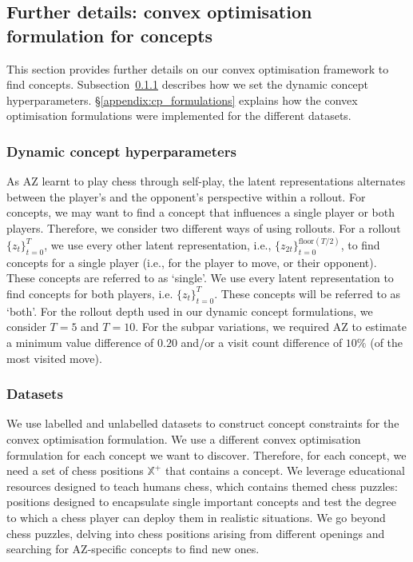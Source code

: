 \documentclass{article}
\def\Xset{\mathbb{X}}
\begin{document}
\subsection{Further details: convex optimisation formulation for concepts}

This section provides further details on our convex optimisation framework to find concepts.
Subsection~\ref{sec:hypers} describes how we set the dynamic concept hyperparameters. 
\S\ref{appendix:cp_formulations} explains how the convex optimisation formulations were implemented for the different datasets. 

\subsubsection{Dynamic concept hyperparameters} \label{sec:hypers}
As AZ learnt to play chess through self-play, the latent representations alternates between the player's and the opponent's perspective within a rollout. 
For concepts, we may want to find a concept that influences a single player or both players. 
Therefore, we consider two different ways of using rollouts. For a rollout  $\{z_{t} \}_{t=0}^T$, we use every other latent representation, i.e., $\{z_{2t} \}_{t=0}^{\text{floor}(T/2)}$, to find concepts for a single player (i.e., for the player to move, or their opponent). These concepts are referred to as `single'. We use every latent representation to find concepts for both players, i.e. $\{z_{t} \}_{t=0}^T$. These concepts will be referred to as `both'.
For the rollout depth used in our dynamic concept formulations, we consider $T=5$ and $T=10$. 
For the subpar variations, we required AZ to estimate a minimum value difference of $0.20$ and/or a visit count difference of $10\%$ (of the most visited move). 

\subsubsection{Datasets}\label{appendix:dataset}
We use labelled and unlabelled datasets to construct concept constraints for the convex optimisation formulation. We use a different convex optimisation formulation for each concept we want to discover. Therefore, for each concept, we need a set of chess positions $\Xset^+$ that contains a concept.
We leverage educational resources designed to teach humans chess, which contains themed chess puzzles: positions designed to encapsulate single important concepts and test the degree to which a chess player can deploy them in realistic situations. We go beyond chess puzzles, delving into chess positions arising from different openings and searching for AZ-specific concepts to find new ones.
\end{document}
